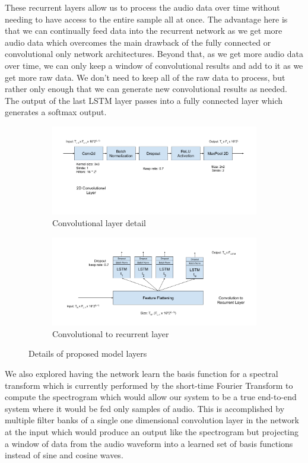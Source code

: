 \documentclass{article}
\begin{document}
These recurrent layers allow us to process
the audio data over time without needing to have access to the entire
sample all at once. The advantage here is that we can continually feed
data into the recurrent network as we get more audio data which
overcomes the main drawback of the fully connected or convolutional
only network architectures. Beyond that, as we get more audio data
over time, we can only keep a window of convolutional results and add
to it as we get more raw data. We don't need to keep all of the raw
data to process, but rather only enough that we can generate new
convolutional results as needed. The output of the last LSTM layer
passes into a fully connected layer which generates a softmax output.
\begin{figure}
  \begin{subfigure}{.5\linewidth}
    \includegraphics[width=\linewidth]{images/crnn-conv_layer}
    \caption{Convolutional layer detail}
    \label{fig:crnn-conv}
  \end{subfigure}%
  \begin{subfigure}{.5\linewidth}
    \includegraphics[width=\linewidth]{images/crnn-lstm_layer}
    \caption{Convolutional to recurrent layer}
    \label{fig:crnn-lstm}
  \end{subfigure}
  \caption{Details of proposed model layers}
\end{figure}
We also explored having the network learn the basis function for a
spectral transform which is currently performed by the short-time
Fourier Transform to compute the spectrogram which would allow our
system to be a true end-to-end system where it would be fed only
samples of audio. This is accomplished by multiple filter banks of a
single one dimensional convolution
layer in the network at the input which would produce an output like the
spectrogram but projecting a window of data from the audio waveform
into a learned set of basis functions instead of sine and cosine waves.
\end{document}
